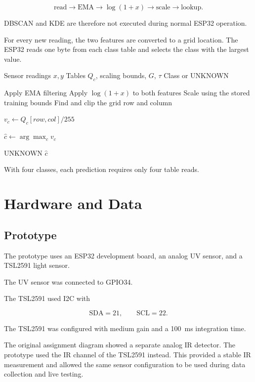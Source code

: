 \documentclass[10pt,a4paper,twocolumn]{article}
\begin{document}
\[
\text{read}
\rightarrow
\text{EMA}
\rightarrow
\log(1+x)
\rightarrow
\text{scale}
\rightarrow
\text{lookup}.
\]

DBSCAN and KDE are therefore not executed during normal ESP32 operation.

For every new reading, the two features are converted to a grid location.
The ESP32 reads one byte from each class table and selects the class with the
largest value.

\begin{algorithm}[H]
\caption{Embedded classification}
\label{alg:lookup}
\small
\begin{algorithmic}[1]

\Require Sensor readings $x,y$
\Require Tables $Q_c$, scaling bounds, $G$, $\tau$
\Ensure Class or UNKNOWN

\State Apply EMA filtering
\State Apply $\log(1+x)$ to both features
\State Scale using the stored training bounds
\State Find and clip the grid row and column

    \State $v_c \gets Q_c[row,col]/255$
\EndFor

\State $\hat{c} \gets \arg\max_c v_c$

    \State \Return UNKNOWN
\Else
    \State \Return $\hat{c}$
\EndIf

\end{algorithmic}
\end{algorithm}

With four classes, each prediction requires only four table reads.


\section{Hardware and Data}

\subsection{Prototype}

The prototype uses an ESP32 development board, an analog UV sensor, and a
TSL2591 light sensor.

The UV sensor was connected to GPIO34.

The TSL2591 used I2C with

\[
\text{SDA}=21,
\qquad
\text{SCL}=22.
\]

The TSL2591 was configured with medium gain and a 100~ms integration time.

The original assignment diagram showed a separate analog IR detector. The
prototype used the IR channel of the TSL2591 instead. This provided a stable IR
measurement and allowed the same sensor configuration to be used during data
collection and live testing.
\end{document}
